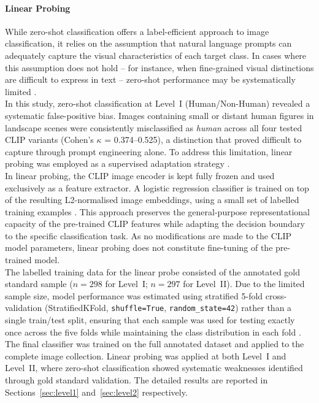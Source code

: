 \documentclass[hidelinks, 11pt]{article}
\begin{document}
\paragraph{Linear Probing}

While zero-shot classification offers a label-efficient approach to image classification, it relies on the assumption that natural language prompts can adequately capture the visual characteristics of each target class. In cases where this assumption does not hold -- for instance, when fine-grained visual distinctions are difficult to express in text -- zero-shot performance may be systematically limited \citep{radford2021learning}.
\\
In this study, zero-shot classification at Level~I (Human/Non-Human) revealed a systematic false-positive bias. Images containing small or distant human figures in landscape scenes were consistently misclassified as \textit{human} across all four tested CLIP variants (Cohen's $\kappa$ = 0.374--0.525), a distinction that proved difficult to capture through prompt engineering alone. 
To address this limitation, linear probing was employed as a supervised adaptation strategy \citep{radford2021learning}.
\\
In linear probing, the CLIP image encoder is kept fully frozen and used exclusively as a feature extractor. A logistic regression classifier is trained on top of the resulting L2-normalised image embeddings, using a small set of labelled training examples \citep{radford2021learning}. This approach preserves the general-purpose representational capacity of the pre-trained CLIP features 
while adapting the decision boundary to the specific classification task. As no modifications are made to the CLIP model parameters, linear probing does not constitute fine-tuning of the pre-trained model.
\\
The labelled training data for the linear probe consisted of the annotated gold standard sample ($n = 298$ for Level~I; $n = 297$ for Level~II). Due to the limited sample size, model performance was estimated using stratified 5-fold cross-validation (StratifiedKFold, \texttt{shuffle=True}, \texttt{random\_state=42}) rather than a single train/test split, ensuring that each sample was used for testing exactly once across the five folds while 
maintaining the class distribution in each fold \citep{sklearn2011}. The final classifier was trained on the full annotated dataset and applied to the complete image collection. Linear probing was applied at both Level~I and Level~II, where 
zero-shot classification showed systematic weaknesses identified through gold standard validation. The detailed results are reported in Sections~\ref{sec:level1} and~\ref{sec:level2} respectively.
\end{document}
